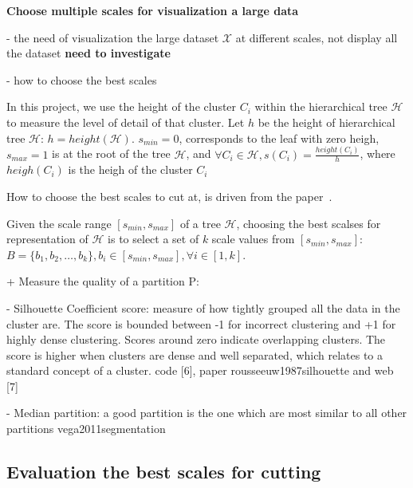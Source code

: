 \textbf{Choose multiple scales for visualization a large data}

- the need of visualization the large dataset $\mathcal{X}$ at different scales, not display all the dataset \textbf{need to investigate}

- how to choose the best scales 

In this project, we use the height of the cluster $C_i$ within the hierarchical tree $\mathcal{H}$ to measure the level of detail of that cluster. Let $h$ be the height of hierarchical tree $\mathcal{H}$: $h = height(\mathcal{H})$. $s_{min} = 0$, corresponds to the leaf with zero heigh, $s_{max} = 1$ is at the root of the tree $\mathcal{H}$, and $\forall C_i \in \mathcal{H}, s(C_i) = \frac{height(C_i)}{h}$, where $heigh(C_i)$ is the heigh of the cluster $C_i$

How to choose the best scales to cut at, is driven from the paper~\cite{pons2011postprocessing}.

Given the scale range $[s_{min},s_{max}]$ of a tree $\mathcal{H}$, choosing the best scalses for representation of $\mathcal{H}$ is to select a set of $k$ scale values from $[s_{min},s_{max}]$: $\mathsf{\textit{B}} = \{b_1, b_2, \ldots, b_k\}, b_i \in [s_{min},s_{max}], \forall i \in [1,k]$. 


+ Measure the quality of a partition P:

- Silhouette Coefficient score: measure of how tightly grouped all the data in the cluster are. The score is bounded between -1 for incorrect clustering and +1 for highly dense clustering. Scores around zero indicate overlapping clusters. The score is higher when clusters are dense and well separated, which relates to a standard concept of a cluster. code [6], paper rousseeuw1987silhouette and web [7]

- Median partition: a good partition is the one which are most similar to all other partitions vega2011segmentation

\subsection{Evaluation the best scales for cutting}
\label{sec:evaluation_cut}


